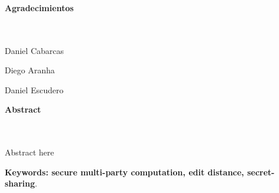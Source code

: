 \newpage{\pagestyle{empty}\cleardoublepage}

\newpage
\thispagestyle{empty} \textbf{}\normalsize
\\\\\\%
\textbf{\LARGE Agradecimientos}
\\\\
Daniel Cabarcas

Diego Aranha

Daniel Escudero



\newpage{\pagestyle{empty}\cleardoublepage}

\newpage
\textbf{\LARGE Abstract}
\\\\
Abstract here\

\textbf{\small Keywords: secure multi-party computation, edit distance, secret-sharing}.\\

